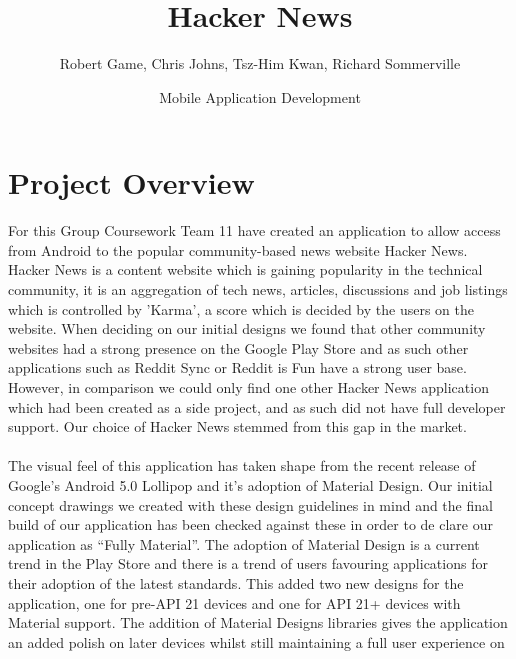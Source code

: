 \documentclass[11pt]{article}
\begin{document}
\title{Hacker News}
\author{Robert Game, Chris Johns, Tsz-Him Kwan, Richard Sommerville}
\date{Mobile Application Development}
\maketitle

\section*{Project Overview}
For this Group Coursework Team 11 have created an application to allow access from Android to the popular community-based news website Hacker News. Hacker News is a content website which is gaining popularity in the technical community, it is an aggregation of tech news, articles, discussions and job listings which is controlled by 'Karma', a score which is decided by the users on the website.  When deciding on our initial designs we found that other community websites had a strong presence on the Google Play Store and as such other applications such as Reddit Sync or Reddit is Fun have a strong user base. However, in comparison we could only find one other Hacker News application which had been created as a side project, and as such did not have full developer support. Our choice of Hacker News stemmed from this gap in the market.
\\
\\
The visual feel of this application has taken shape from the recent release of Google's Android 5.0 Lollipop and it's adoption of Material Design. Our initial concept drawings we created with these design guidelines in mind and the final build of our application has been checked against these in order to de clare our application as “Fully Material”. The adoption of Material Design is a current trend in the Play Store and there is a trend of users favouring applications for their adoption of the latest standards. This added two new designs for the application, one for pre-API 21 devices and one for API 21+ devices with Material support. The addition of Material Designs libraries gives the application an added polish on later devices whilst still maintaining a full user experience on 
\\
\\
\end{document}

